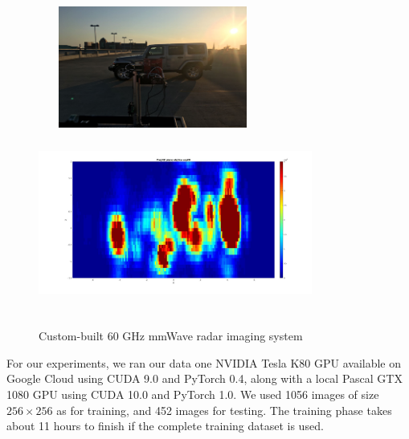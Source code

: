 \begin{figure}
	\centering
	\includegraphics[width=7.5cm,height=4cm]{./figure/exp_1.png}\\
	\includegraphics[width=9cm,height=6cm]{./figure/exp_1_img.jpg}
	\caption{Custom-built 60 GHz mmWave radar imaging system}
\end{figure}


For our experiments, we ran our data one NVIDIA Tesla K80 GPU available on Google Cloud using CUDA 9.0 and PyTorch 0.4, along with a local Pascal GTX 1080 GPU using CUDA 10.0 and PyTorch 1.0. We used 1056 images of size $256 \times 256$ as for training, and 452 images for testing. The training phase takes about 11 hours to finish if the complete training dataset is used.

